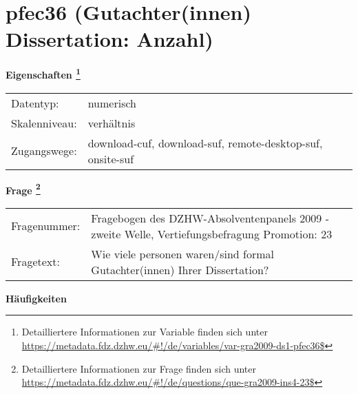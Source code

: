 
    \setcounter{footnote}{0}

    \vspace*{-1.8cm}
	\section{pfec36 (Gutachter(innen) Dissertation: Anzahl)}
	\label{section:pfec36}



    \vspace*{0.5cm}
    \noindent\textbf{Eigenschaften
	\footnote{Detailliertere Informationen zur Variable finden sich unter
		\url{https://metadata.fdz.dzhw.eu/\#!/de/variables/var-gra2009-ds1-pfec36$}}}\\
	\begin{tabularx}{\hsize}{@{}lX}
	Datentyp: & numerisch \\
	Skalenniveau: & verhältnis \\
	Zugangswege: &
	  download-cuf, 
	  download-suf, 
	  remote-desktop-suf, 
	  onsite-suf
 \\
    \end{tabularx}



				\vspace*{0.5cm}
                \noindent\textbf{Frage
	                \footnote{Detailliertere Informationen zur Frage finden sich unter
		              \url{https://metadata.fdz.dzhw.eu/\#!/de/questions/que-gra2009-ins4-23$}}}\\
				\begin{tabularx}{\hsize}{@{}lX}
					Fragenummer: &
					  Fragebogen des DZHW-Absolventenpanels 2009 - zweite Welle, Vertiefungsbefragung Promotion:
					  23
 \\
					Fragetext: & Wie viele personen waren/sind formal Gutachter(innen) Ihrer Dissertation? \\
				\end{tabularx}





        		\vspace*{0.5cm}
                \noindent\textbf{Häufigkeiten}

